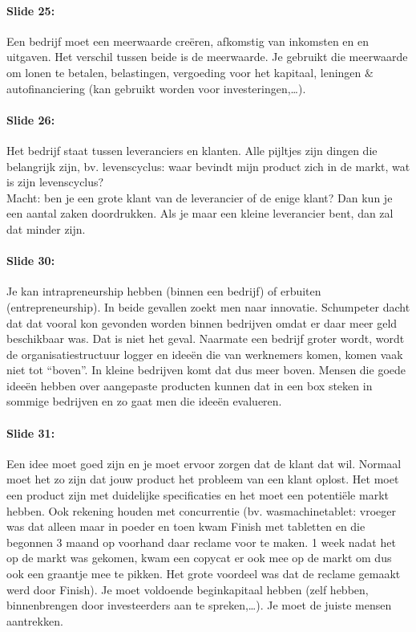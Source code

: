 \documentclass[10pt,a4paper]{report}
\begin{document}
\paragraph{Slide 25:} Een bedrijf moet een meerwaarde cre\"eren, afkomstig van inkomsten en en uitgaven. Het verschil tussen beide is de meerwaarde. Je gebruikt die meerwaarde om lonen te betalen, belastingen, vergoeding voor het kapitaal, leningen $\&$ autofinanciering (kan gebruikt worden voor investeringen,…).

\paragraph{Slide 26:} Het bedrijf staat tussen leveranciers en klanten. Alle pijltjes zijn dingen die belangrijk zijn, bv. levenscyclus: waar bevindt mijn product zich in de markt, wat is zijn levenscyclus?\\ Macht: ben je een grote klant van de leverancier of de enige klant? Dan kun je een aantal zaken doordrukken. Als je maar een kleine leverancier bent, dan zal dat minder zijn.

\paragraph{Slide 30:} Je kan intrapreneurship hebben (binnen een bedrijf) of erbuiten (entrepreneurship). In beide gevallen zoekt men naar innovatie. Schumpeter dacht dat dat vooral kon gevonden worden binnen bedrijven omdat er daar meer geld beschikbaar was. Dat is niet het geval. Naarmate een bedrijf groter wordt, wordt de organisatiestructuur logger en idee\"en die van werknemers komen, komen vaak niet tot ``boven''. In kleine bedrijven komt dat dus meer boven. Mensen die goede idee\"en hebben over aangepaste producten kunnen dat in een box steken in sommige bedrijven en zo gaat men die idee\"en evalueren.

\paragraph{Slide 31:} Een idee moet goed zijn en je moet ervoor zorgen dat de klant dat wil. Normaal moet het zo zijn dat jouw product het probleem van een klant oplost. Het moet een product zijn met duidelijke specificaties en het moet een potenti\"ele markt hebben. Ook rekening houden met concurrentie (bv. wasmachinetablet: vroeger was dat alleen maar in poeder en toen kwam Finish met tabletten en die begonnen 3 maand op voorhand daar reclame voor te maken. 1 week nadat het op de markt was gekomen, kwam een copycat er ook mee op de markt om dus ook een graantje mee te pikken. Het grote voordeel was dat de reclame gemaakt werd door Finish). Je moet voldoende beginkapitaal hebben (zelf hebben, binnenbrengen door investeerders aan te spreken,…). Je moet de juiste mensen aantrekken.
\end{document}
